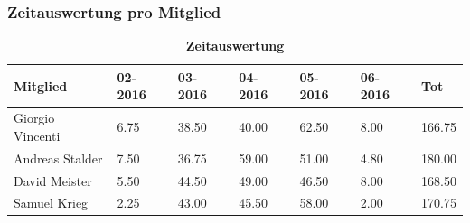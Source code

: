 \documentclass[a4,12pt]{scrartcl}
\begin{document}
\subsubsection{Zeitauswertung pro Mitglied}
\begin{table}[H]
\centering
    \begin{tabular}{@{} p{3cm} p{1.5cm} p{1.5cm} p{1.5cm} p{1.5cm} p{1.5cm} p{1.5cm} @{}}\toprule    
    {Mitglied} & {02-2016} & {03-2016} & {04-2016} & {05-2016} & {06-2016} & {Tot}\\ \midrule
    Giorgio Vincenti & 6.75  & 38.50 & 40.00 & 62.50 & 8.00 & 166.75  \\ \addlinespace
    Andreas Stalder & 7.50 &36.75  & 59.00 & 51.00 & 4.80 & 180.00\\ \addlinespace
    David Meister &  5.50 & 44.50 & 49.00 & 46.50 & 8.00 & 168.50\\ \addlinespace
    Samuel Krieg &  2.25 & 43.00  & 45.50 & 58.00 & 2.00 & 170.75\\ 
    \bottomrule
    \end{tabular}
\caption{\textbf{Zeitauswertung}}
\end{table}
\end{document}
